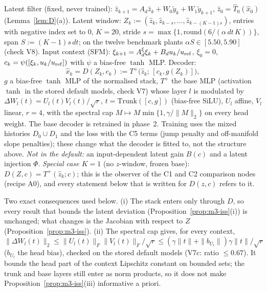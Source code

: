 \begin{definition}\label{def:m1-default}
 Latent filter (fixed, never trained):
$\hat z_{k+1}=A_d\hat z_k+W_0\tilde y_k+W_1\tilde y_{k+1}$, $\hat z_0=\hat T_0(\hat x_0)$ (Lemma~\ref{lem:D}(a)).
Latent window: $Z_k:=(\hat z_k,\hat z_{k-s},\dots,\hat z_{k-(K-1)s})$, entries with negative index set to $0$, $K=20$,
stride $s=\max\{1,\mathrm{round}(6/(\alpha\,dt\,K))\}$, span $S:=(K-1)s\,dt$; on the twelve benchmark plants
$\alpha S\in[5.50,5.90]$ (check V8). Input context (SFM): $\xi_{k+1}=A^\xi_d\xi_k+B_du_k/u_{\rm ref}$, $\xi_0=0$,
$c_k=\psi([\xi_k,u_k/u_{\rm ref}])$ with $\psi$ a bias-free $\tanh$ MLP. Decoder:
\[
\hat x_k=D(Z_k,c_k):=T^+\big(\hat z_k;\,[c_k,g(Z_k)]\big),
\]
$g$ a bias-free $\tanh$ MLP of the normalised stack, $T^+$ the base MLP (activation $\tanh$ in the stored default
models, check V7) whose layer $l$ is modulated by $\Delta W_l(t)=U_l(t)V_l(t)/\sqrt r$, $t=\mathrm{Trunk}([c,g])$
(bias-free SiLU), $U_l$ affine, $V_l$ linear, $r=4$, with the spectral cap $M\mapsto M\min\{1,\gamma/\|M\|_2\}$ on
every head weight. The base decoder is retrained in phase~2. Training uses the mixed histories $D_0\cup D_1$ and the
loss with the C5 terms (jump penalty and off-manifold slope penalties); these change what the decoder is fitted to, not
the structure above. \emph{Not in the default:} an input-dependent latent gain $B(c)$ and a latent injection $\Phi$.
\emph{Special case $K=1$} (no $z$-window, frozen base): $D(Z,c)=T^+(\hat z_k;c)$; this is the observer of the C1 and C2
comparison nodes (recipe A0), and every statement below that is written for $D(z,c)$ refers to it.
\end{definition}
\noindent Two exact consequences used below. (i) The stack enters only through $D$, so every result that bounds
the latent deviation (Proposition~\ref{prop:m3-iss}(i)) is unchanged; what changes is the Jacobian with respect to
$Z$ (Proposition~\ref{prop:m3-iss}). (ii) The spectral cap gives, for every context,
$\|\Delta W_l(t)\|_2\le\|U_l(t)\|_F\|V_l(t)\|_F/\sqrt r\le(\gamma\|t\|+\|b_{U_l}\|)\gamma\|t\|/\sqrt r$ ($b_{U_l}$ the
head bias), checked on the stored default models (V7c: ratio $\le0.67$). It bounds the head part of the context
Lipschitz constant on bounded sets; the trunk and base layers still enter as norm products, so it does not make
Proposition~\ref{prop:m3-iss}(iii) informative a priori. 

